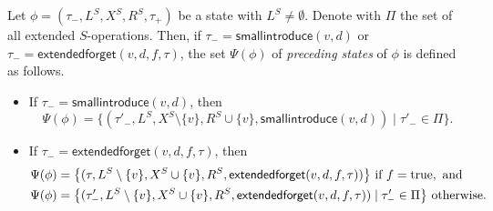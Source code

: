\documentclass[a4paper,UKenglish,cleveref, autoref, thm-restate, numberwithinsect]{lipics-v2021}
\newcommand{\smallintroduce}{\mathsf{smallintroduce}}
\newcommand{\extendedforget}{\mathsf{extendedforget}}
\newcommand{\true}{\textup{true}}
\begin{document}
\begin{definition}\label{def:preceding}
Let $\phi=(\tau_-,L^S, X^S, R^S,\tau_+)$ be a state with $L^S\neq\emptyset$. Denote with $\Pi$ the set of all extended $S$-operations. Then, if $\tau_-=\smallintroduce(v,d)$ or  $\tau_-=\extendedforget(v,d,f,\tau)$, the set $\Psi(\phi)$ of \emph{preceding states} of $\phi$ is defined as follows. 
\begin{itemize}
\item If $\tau_-=\smallintroduce(v,d)$, then 
        \[
        \Psi(\phi) = \bigl\{ (\tau'_-,L^S, X^S\setminus\{v\}, R^S\cup\{v\},\smallintroduce(v,d)) \mid \tau'_- \in \Pi\bigr\}.
        \]
        \item If $\tau_-=\extendedforget(v,d,f,\tau)$, then
        \begin{align*}
        & \Psi(\phi)=\bigl\{(\tau,L^S\setminus\{v\}, X^S\cup\{v\}, R^S,\extendedforget(v,d,f,\tau))\bigr\} \text{ if } f=\true, \text{ and}\\
        & \Psi(\phi)=\bigl\{(\tau'_-,L^S\setminus\{v\}, X^S\cup\{v\}, R^S,\extendedforget(v,d,f,\tau)) \mid \tau'_- \in \Pi\bigr\} \text{ otherwise.}
        \end{align*}
\end{itemize}


\end{definition}
\end{document}
